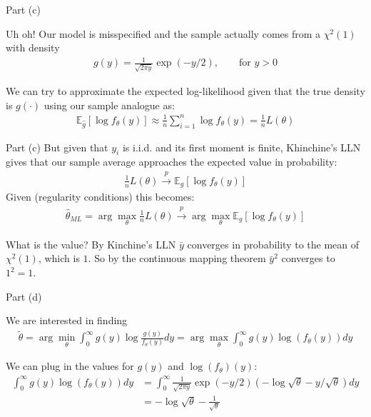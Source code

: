\begin{frame}{Part (c)}

    Uh oh! Our model is misspecified and the sample actually comes from a $\chi^2(1)$ with density
    \begin{align*}
        g(y) = \frac{1}{\sqrt{2 \pi y}} \exp( - y/2), \qquad \text{for } y > 0
    \end{align*}
    
    We can try to approximate the expected log-likelihood given that the true density is $g(\cdot)$ using our sample analogue as:
    \begin{align*}
        \mathbb{E}_{\hat{g}}[\log f_\theta(y)] \approx \frac{1}{n} \sum_{i=1}^n \log f_\theta(y) = \frac{1}{n} L(\theta)
    \end{align*}

\end{frame}

\begin{frame}{Part (c)}
    But given that $y_i$ is i.i.d. and its first moment is finite, Khinchine's LLN gives that our sample average approaches the expected value in probability:
    \begin{align*}
        \frac{1}{n} L(\theta) \xrightarrow{p} \mathbb{E}_g[\log f_\theta(y)]
    \end{align*}
    Given (regularity conditions) this becomes:
    \begin{align*}
         \hat{\theta}_{ML} = \arg \max_{\theta} \frac{1}{n} L(\theta) \xrightarrow{p} \arg \max_{\theta} \mathbb{E}_g[\log f_\theta(y)]
    \end{align*}

    What is the value? By Kinchine's LLN $\bar{y}$ converges in probability to the mean of $\chi^2(1)$, which is $1$. So by the continuous mapping theorem $\bar{y}^2$ converges to $1^2 = 1$.
    
\end{frame}

\begin{frame}{Part (d)}

    We are interested in finding
    \begin{align*}
        \tilde{\theta} = \arg \min_\theta \int_0^\infty g(y) \log \frac{g(y)}{f_\theta (y)} dy = \arg \max_\theta \int_0^\infty g(y) \log( f_\theta(y)) dy
    \end{align*}

    We can plug in the values for $g(y)$ and $\log (f_\theta)(y)$:
    \begin{align*}
        \int_0^\infty g(y) \log( f_\theta(y)) dy &= \int_0^\infty \frac{1}{\sqrt{2\pi y}} \exp(-y/2) (- \log \sqrt{\theta} - y /\sqrt{\theta}) dy
        \\
        &= - \log \sqrt{\theta} - \frac{1}{\sqrt{\theta}}
    \end{align*}

\end{frame}

